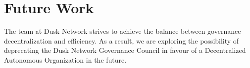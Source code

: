 \documentclass{article}
\begin{document}
\section{Future Work}
The team at Dusk Network strives to achieve the balance between governance decentralization and efficiency. As a result, we are exploring the possibility of deprecating the Dusk Network Governance Council in favour of a Decentralized Autonomous Organization \cite{wang} in the future.

\clearpage

\printbibliography
\end{document}
